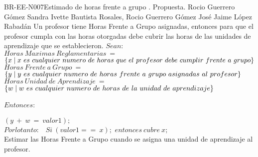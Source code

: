 \begin{BusinessRule}{BR-EE-N007}{Estimado de horas frente a grupo}
	{\bcCondition}    %
	{\btEnabler}     %
	{\blControlling}    %
	.
	\BRItem[Estado] Propuesta.
	 Rocio Guerrero Gómez
	 Sandra Ivette Bautista Rosales, Rocio Guerrero Gómez
	 José Jaime López Rabadán
	\BRItem[Descripción] Un profesor tiene Horas Frente a Grupo asignadas, entonces para que el profesor cumpla con las horas otorgadas debe cubrir las horas de las unidades de aprendizaje que se establecieron.
		\BRItem[Sentencia]  $Sean:$ \\
		$Horas\ Maximas\ Reglamentarias\ =$ $\{x \mid x\ es\ cualquier\ numero\ de\ horas\ que\ el\ profesor\ debe\\\ cumplir\ frente\ a\ grupo\}$ \\
		$Horas\ Frente\ a\ Grupo\ =$ $\{y \mid y\ es\ cualquier\ numero\ de\ horas\ frente\ a\ grupo\ asignadas\ al\\\ profesor\}$ \\
		$Horas\ Unidad\ de\ Aprendizaje\ =$ $\{w \mid w\ es\ cualquier\ numero\ de\ horas\ de\ la\ unidad\ de\\\ aprendizaje\}$ \\\\
		$Entonces:$ \\\\
		$(y\ +\ w\ =\ valor1);$ \\
		$Por lo tanto:$ \ $Si\ (valor1 ==\ x);$  $entonces\ cubre\ x;$  \\		
	\BRItem[Motivación] Estimar las Horas Frente a Grupo cuando se asigna una unidad de aprendizaje al profesor.
		

\end{BusinessRule}
